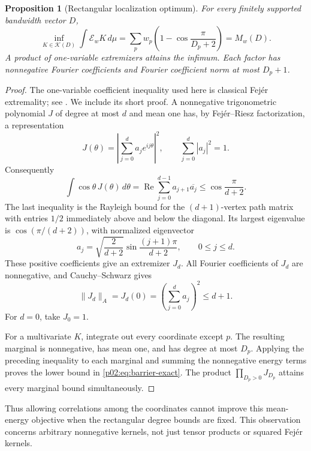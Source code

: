 \documentclass[11pt,letterpaper]{article}
\newtheorem{proposition}[theorem]{Proposition}
\theoremstyle{definition}
\theoremstyle{remark}
\newcommand{\1}{\mathbf 1}
\begin{document}
\begin{proposition}[Rectangular localization optimum]
\label{p02:prop:barrier-exact}
For every finitely supported bandwidth vector $D$,
\begin{equation}\label{p02:eq:barrier-exact}
 \inf_{K\in\mathcal K(D)}\int \mathcal E_w K\,d\mu
 =\sum_pw_p\left(1-\cos\frac{\pi}{D_p+2}\right)=M_w(D).
\end{equation}
A product of one-variable extremizers attains the infimum. Each factor
has nonnegative Fourier coefficients and Fourier coefficient norm at most
$D_p+1$.
\end{proposition}

\begin{proof}
The one-variable coefficient inequality used here is classical Fej\'er
extremality; see \cite{FejerMulti}. We include its short proof. A
nonnegative trigonometric polynomial $J$ of degree at most $d$ and mean one
has, by Fej\'er--Riesz factorization, a representation
\[
 J(\theta)=\left|\sum_{j=0}^d a_je^{ij\theta}\right|^2,
 \qquad \sum_{j=0}^d|a_j|^2=1.
\]
Consequently
\[
 \int\cos\theta\,J(\theta)\,d\theta
 =\operatorname{Re}\sum_{j=0}^{d-1}a_{j+1}\overline{a_j}
 \le\cos\frac{\pi}{d+2}.
\]
The last inequality is the Rayleigh bound for the $(d+1)$-vertex path
matrix with entries $1/2$ immediately above and below the diagonal. Its
largest eigenvalue is $\cos(\pi/(d+2))$, with normalized eigenvector
\[
 a_j=\sqrt{\frac2{d+2}}\sin\frac{(j+1)\pi}{d+2},
 \qquad 0\le j\le d.
\]
These positive coefficients give an extremizer $J_d$. All Fourier
coefficients of $J_d$ are nonnegative, and Cauchy--Schwarz gives
\[
 \|J_d\|_A=J_d(0)
 =\left(\sum_{j=0}^d a_j\right)^2\le d+1.
\]
For $d=0$, take $J_0=1$.

For a multivariate $K$, integrate out every coordinate except $p$.
The resulting marginal is nonnegative, has mean one, and has degree at
most $D_p$. Applying the preceding inequality to each marginal and
summing the nonnegative energy terms proves the lower bound in
\eqref{p02:eq:barrier-exact}. The product
$\prod_{D_p>0}J_{D_p}$ attains every marginal bound simultaneously.
\end{proof}

Thus allowing correlations among the coordinates cannot improve this
mean-energy objective when the rectangular degree bounds are fixed.
This observation concerns arbitrary nonnegative kernels, not just tensor
products or squared Fej\'er kernels.
\end{document}
